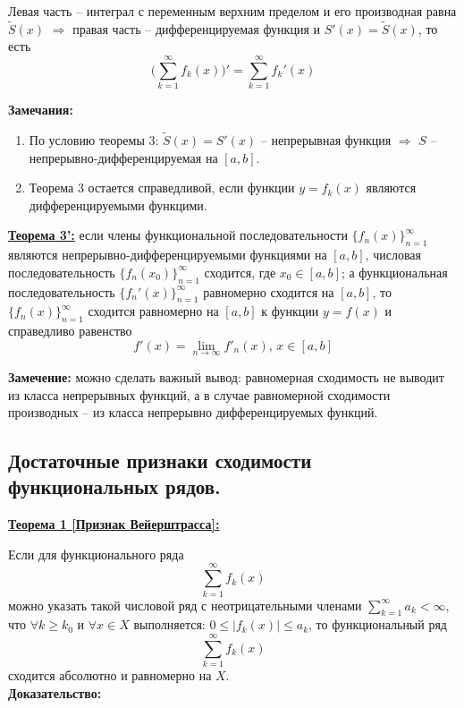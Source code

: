 \documentclass[a4paper,12pt]{article} %
\begin{document}
Левая часть -- интеграл с переменным верхним пределом и его производная равна $\widetilde{S}(x)$ $\Rightarrow$ правая часть -- дифференцируемая функция и $S'(x) = \widetilde{S}(x)$, то есть 
$$\bigg(\sum\limits_{k = 1}^{\infty}  f_k(x)\bigg)' = \sum\limits_{k = 1}^{\infty}  f_k'(x)$$

\noindent \textbf{Замечания:}
\begin{enumerate}
    \item По условию теоремы 3: $\widetilde{S}(x) = S'(x)$ -- непрерывная функция $\Rightarrow$ $S$ -- непрерывно-дифференцируемая на $[a,b]$.
    
    \item Теорема 3 остается справедливой, если функции $y=f_k(x)$ являются дифференцируемыми функцими.\\
\end{enumerate}

\underline{\textbf{Теорема 3':}} если члены функциональной последовательности $\{f_n(x)\}_{n=1}^\infty$ являются непрерывно-дифференцируемыми функциями на $[a,b]$, числовая последовательность $\{f_n(x_0)\}_{n=1}^\infty$ сходится, где $x_0 \in [a,b]$; а функциональная последовательность $\{f_n'(x)\}_{n=1}^\infty$ равномерно сходится на $[a,b]$, то $\{f_n(x)\}_{n=1}^\infty$ сходится равномерно на $[a,b]$ к функции $y = f(x)$ и справедливо равенство $$f'(x)= \lim\limits_{n\rightarrow \infty} f'_n(x) \text{, }x \in [a,b]$$

\textbf{Замечение:} можно сделать важный вывод: равномерная сходимость не выводит из класса непрерывных функций, а в случае равномерной сходимости производных -- из класса непрерывно дифференцируемых функций.

\subsection{Достаточные признаки сходимости функциональных рядов.}

\underline{\textbf{Теорема 1 [Признак Вейерштрасса]:}}

Если для функционального ряда $$\sum\limits_{k = 1}^{\infty}  f_k(x)$$ можно указать такой числовой ряд с неотрицательными членами $\sum\limits_{k = 1}^{\infty}a_k < \infty$, что $\forall k \geq k_0$ и $\forall x \in X$ выполняется: $0 \leq |f_k(x)| \leq a_k$, то функциональный ряд  $$\sum\limits_{k = 1}^{\infty}  f_k(x)$$ сходится абсолютно и равномерно на $X$.\\

\textbf{Доказательство:}
\end{document}

